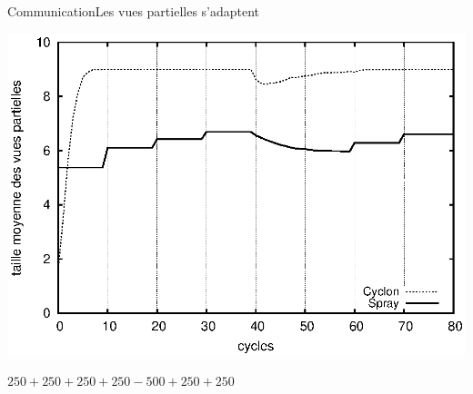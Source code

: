 \begin{frame}{Communication}{Les vues partielles s'adaptent}
  \begin{center}
    \includegraphics[width=1\textwidth]{img/network/avgpv.eps}
  \end{center}
  \begin{center}
    $250+250+250+250-500+250+250$
  \end{center}
\end{frame}



